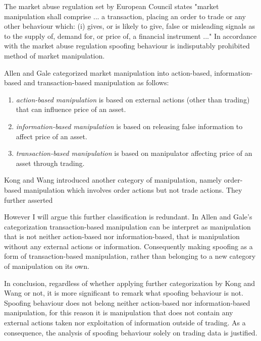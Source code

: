 \documentclass{tut-thesis}
\begin{document}

The market abuse regulation set by European Council states "market manipulation shall comprise ... a transaction, placing an order to trade or any other behaviour which: (i) gives, or is likely to give, false or misleading signals as to the supply of, demand for, or price of, a financial instrument ..." \autocite{EU-596-2014} In accordance with the market abuse regulation spoofing behaviour is indisputably prohibited method of market manipulation.

Allen and Gale categorized market manipulation into action-based, information-based and transaction-based manipulation as follows:
\begin{enumerate}
	\item \textit{action-based manipulation} is based on external actions (other than trading) that can influence price of an asset.
	\item \textit{information-based manipulation} is based on releasing false information to affect price of an asset.
	\item \textit{transaction-based manipulation}	is based on manipulator affecting price of an asset through trading.\autocite*{AllenGale1992}
\end{enumerate}

Kong and Wang \cite*{KongWang2013} introduced another category of manipulation, namely order-based manipulation which involves order actions but not trade actions. They further asserted 

However I will argue this further classification is redundant. In Allen and Gale's categorization transaction-based manipulation can be interpret as manipulation that is not neither action-based nor information-based, that is manipulation without any external actions or information. Consequently making spoofing as a form of transaction-based manipulation, rather than belonging to a new category of manipulation on its own.

In conclusion, regardless of whether applying further categorization by Kong and Wang or not, it is more significant to remark what spoofing behaviour is not. Spoofing behaviour does not belong neither action-based nor information-based manipulation, for this reason it is manipulation that does not contain any external actions taken nor exploitation of information outside of trading. As a consequence, the analysis of spoofing behaviour solely on trading data is justified.
\end{document}
